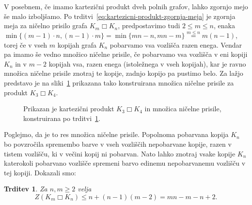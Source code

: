 \documentclass[12pt,a4paper,twoside]{article}
\theoremstyle{definition} %
\theoremstyle{plain} %
\newtheorem{trditev}[definicija]{Trditev}
\numberwithin{equation}{section}  %
\DeclareMathOperator{\boxempty}{\Box}
\begin{document}
V posebnem, če imamo kartezični produkt dveh polnih grafov, lahko zgornjo mejo še malo izboljšamo. Po trditvi~\ref{eq:kartezicni-produkt-zgornja-meja} je zgornja meja za ničelno prisilo grafa $K_m \boxempty K_n$, predpostavimo tudi $2 \leq m \leq n$, enaka $\min \{(m-1)\cdot n, (n-1) \cdot m\} = \min \{ mn - n , mn - m\} \stackrel{m \leq n}{=} m (n-1) $, torej če v vseh $m$ kopijah grafa $K_n$ pobarvamo vsa vozlišča razen enega. Vendar pa imamo še vedno množico ničelne prisile, če pobarvamo vsa vozlišča v eni kopiji $K_n$ in v $m-2$ kopijah vsa, razen enega (istoležnega v vseh kopijah), kar je ravno množica ničelne prisile znotraj te kopije, zadnjo kopijo pa pustimo belo. Za lažjo predstavo je na sliki~\ref{fig:zf-kartezicni-produkt-polnih} prikazana tako konstruirana množica ničelne prisile za produkt $K_3 \boxempty K_4$.
\begin{figure}[h]
    \centering
\caption{Prikazan je kartezični produkt $K_3 \boxempty K_4$ in množica ničelne prisile, konstruirana po trditvi~\ref{trd:kartezicni-produkt-zgornja-meja-polni}.}
\label{fig:zf-kartezicni-produkt-polnih}
\end{figure}

Poglejmo, da je to res množica ničelne prisile. Popolnoma pobarvana kopija $K_n$ bo povzročila spremembo barve v vseh vozliščih nepobarvane kopije, razen v tistem vozlišču, ki v večini kopij ni pobarvan. Nato lahko znotraj vsake kopije $K_n$ katerokoli pobarvano vozlišče spremeni barvo edinemu nepobarvanemu vozlišču v tej kopiji. Dokazali smo:
\begin{trditev}
    \label{trd:kartezicni-produkt-zgornja-meja-polni}
    Za $n, m \geq 2$ velja
    \begin{equation}
        \label{eq:kartezicni-produkt-zgornja-meja-polni}
        Z(K_m \boxempty K_n) \leq n + (n-1)(m-2) = m n - m - n + 2.
    \end{equation}
\end{trditev}
\end{document}
